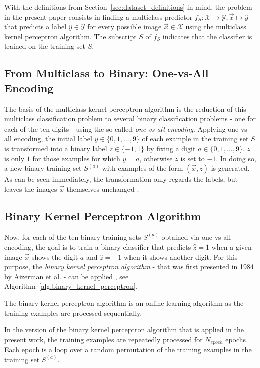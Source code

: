 With the definitions from Section~\ref{sec:dataset_definitions} in mind, the problem in the present paper consists in finding a multiclass predictor $f_S: \mathcal{X} \rightarrow \mathcal{Y}, \vec{x} \mapsto \hat{y}$ that predicts a label $\hat{y} \in \mathcal{Y}$ for every possible image $\vec{x} \in \mathcal{X}$ using the multiclass kernel perceptron algorithm. The subscript $S$ of $f_S$ indicates that the classifier is trained on the training set $S$.

\subsection{From Multiclass to Binary: One-vs-All Encoding}

The basis of the multiclass kernel perceptron algorithm is the reduction of this multiclass classification problem to several binary classification problems - one for each of the ten digits - using the so-called \textit{one-vs-all encoding}. Applying one-vs-all encoding, the initial label $y \in \{0, 1, \dots, 9\}$ of each example in the training set $S$ is transformed into a binary label $z \in \{-1, 1\}$ by fixing a digit $a \in \{0, 1, \dots, 9\}$. $z$ is only $1$ for those examples for which $y=a$, otherwise $z$ is set to $-1$. In doing so, a new binary training set $S^{(a)}$ with examples of the form $(\vec{x}, z)$ is generated. As can be seen immediately, the transformation only regards the labels, but leaves the images $\vec{x}$ themselves unchanged \cite{multiclass2005}.

\subsection{Binary Kernel Perceptron Algorithm}
Now, for each of the ten binary training sets $S^{(a)}$ obtained via one-vs-all encoding, the goal is to train a binary classifier that predicts $\hat{z}=1$ when  a given image $\vec{x}$ shows the digit $a$ and $\hat{z}=-1$ when it shows another digit. For this purpose, the \textit{binary kernel perceptron algorithm} - that was first presented in 1984 by Aizerman et al. - can be applied \cite{kernel1964}, see Algorithm~\ref{alg:binary_kernel_perceptron}. 

The binary kernel perceptron algorithm is an online learning algorithm as the training examples are processed sequentially. 

In the version of the binary kernel perceptron algorithm that is applied in the present work, the training examples are repeatedly processed for $N_{epoch}$ epochs. Each epoch is a loop over a random permutation of the training examples in the training set $S^{(a)}$.\\ 

